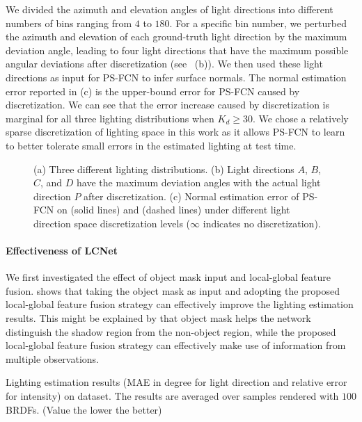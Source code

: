 We divided the azimuth and elevation angles of light directions into different numbers of bins ranging from $4$ to $180$.
For a specific bin number, we perturbed the azimuth and elevation of each ground-truth light direction by the maximum deviation angle, leading to four light directions that have the maximum possible angular deviations after discretization (see ~(b)).
We then used these light directions as input for PS-FCN to infer surface normals. The normal estimation error reported in  (c) is the upper-bound error for PS-FCN caused by discretization.
We can see that the error increase caused by discretization is marginal for all three lighting distributions when $K_d\ge30$.
We chose a relatively sparse discretization of lighting space in this work as it allows PS-FCN to learn to better tolerate small errors in the estimated lighting at test time.

\begin{figure}[tbp] \centering
    
    \caption[Results of LCNet under different light direction space discretization levels]{(a) Three different lighting distributions. (b) Light directions $A$, $B$, $C$, and $D$ have the maximum deviation angles with the actual light direction $P$ after discretization. (c) Normal estimation error of PS-FCN on  (solid lines) and  (dashed lines) under different light direction space discretization levels ($\infty$ indicates no discretization).} \label{fig:discretization}
\end{figure}

\paragraph{Effectiveness of LCNet}
We first investigated the effect of object mask input and local-global feature fusion.
 shows that taking the object mask as input and adopting the proposed local-global feature fusion strategy can effectively improve the lighting estimation results.
This might be explained by that object mask helps the network distinguish the shadow region from the non-object region, while the proposed local-global feature fusion strategy can effectively make use of information from multiple observations. 

\begin{table}[tbp] \centering
    \caption[Lighting estimation results of LCNet on \syntestMERL dataset]{Lighting estimation results (MAE in degree for light direction and relative error for intensity) on \syntestMERL dataset. The results are averaged over samples rendered with $100$ BRDFs. (Value the lower the better)}
     \label{tab:quant_light_synth}
\end{table}

